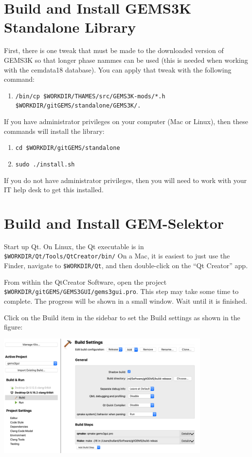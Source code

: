 \documentclass{article}
\begin{document}
\section{Build and Install GEMS3K Standalone Library}
First, there is one tweak that must be made to the downloaded version of GEMS3K so that
longer phase nammes can be used (this is needed when working with the cemdata18 database).
You can apply that tweak with the following command:
\begin{enumerate}
    \item \verb!/bin/cp $WORKDIR/THAMES/src/GEMS3K-mods/*.h $WORKDIR/gitGEMS/standalone/GEMS3K/.!
\end{enumerate}

If you have administrator privileges on your computer (Mac or Linux), then these commands
will install the library:
\begin{enumerate}
        \item \verb!cd $WORKDIR/gitGEMS/standalone!
        \item \verb!sudo ./install.sh!
\end{enumerate}
If you do not have administrator privileges, then you will need to work with your IT
help desk to get this installed.

\section{Build and Install GEM-Selektor}
Start up Qt.  On Linux, the Qt executable is in \verb!$WORKDIR/Qt/Tools/QtCreator/bin/!
On a Mac, it is easiest to just use the Finder, navigate to \verb!$WORKDIR/Qt!, and then
double-click on the ``Qt Creator'' app.

From within the QtCreator Software, open the project \verb!$WORKDIR/gitGEMS/GEMS3GUI/gems3gui.pro!.
This step may take some time to complete.  The progress will be shown in a small window.  Wait
until it is finished.

Click on the Build item in the sidebar to set the Build settings as shown in the figure:

\begin{center}
    \includegraphics[width=0.8\textwidth]{Figures/Qt-build-settings.png}
\end{center}
\end{document}
